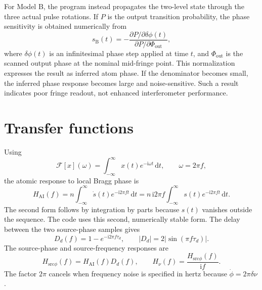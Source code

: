 \documentclass[11pt,a4paper]{article}
\newcommand{\dd}{\,\mathrm{d}}
\newcommand{\ii}{\mathrm{i}}
\newcommand{\Hatom}{H_{\mathrm{AI}}}
\newcommand{\Hsrc}{H_{\mathrm{src}\phi}}
\newcommand{\Hnu}{H_{\nu}}
\newcommand{\taud}{\tau_{d}}
\begin{document}
For Model B, the program instead propagates the two-level state through the three actual pulse rotations. If $P$ is the output transition probability, the phase sensitivity is obtained numerically from
\begin{equation}
 s_{\mathrm B}(t)
 =-\frac{\partial P/\partial\delta\phi(t)}{\partial P/\partial\Phi_{\mathrm{out}}},
 \label{eq:model-b-sensitivity}
\end{equation}
where $\delta\phi(t)$ is an infinitesimal phase step applied at time $t$, and $\Phi_{\mathrm{out}}$ is the scanned output phase at the nominal mid-fringe point. This normalization expresses the result as inferred atom phase. If the denominator becomes small, the inferred phase response becomes large and noise-sensitive. Such a result indicates poor fringe readout, not enhanced interferometer performance.

\section{Transfer functions}\label{sec:transfer}

Using
\begin{equation}
 \mathcal{F}[x](\omega)=\int_{-\infty}^{\infty}x(t)e^{-\ii\omega t}\dd t,
 \qquad \omega=2\pi f,
\end{equation}
the atomic response to local Bragg phase is
\begin{equation}
 \Hatom(f)=n\int_{-\infty}^{\infty}\dot{s}(t)e^{-\ii2\pi ft}\dd t
 =n\,\ii2\pi f\int_{-\infty}^{\infty}s(t)e^{-\ii2\pi ft}\dd t.
 \label{eq:hai}
\end{equation}
The second form follows by integration by parts because $s(t)$ vanishes outside the sequence. The code uses this second, numerically stable form. The delay between the two source-phase samples gives
\begin{equation}
 D_d(f)=1-e^{-\ii2\pi f\taud},
 \qquad |D_d|=2|\sin(\pi f\taud)|.
 \label{eq:delay-filter}
\end{equation}
The source-phase and source-frequency responses are
\begin{equation}
 \Hsrc(f)=\Hatom(f)D_d(f),
 \qquad
 \Hnu(f)=\frac{\Hsrc(f)}{\ii f}.
 \label{eq:combined}
\end{equation}
The factor $2\pi$ cancels when frequency noise is specified in hertz because $\dot{\phi}=2\pi\delta\nu$.
\end{document}

